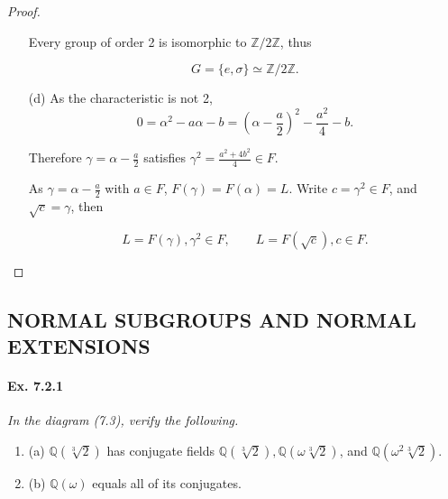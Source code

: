 \documentclass[11pt,a4paper]{article}
\newcommand{\be} {\begin{enumerate}}
\newcommand{\ee} {\end{enumerate}}
\newcommand{\Q}{\mathbb{Q}}
\newcommand{\Z}{\mathbb{Z}}
\begin{document}
\begin{proof}
\begin{enumerate}
Every group of order 2 is isomorphic to  $\Z/2\Z$, thus

$$G = \{e,\sigma\} \simeq \Z/2\Z.$$


\item[(d)]
As the characteristic is not 2,
$$0 = \alpha^2 - a\alpha - b = \left(\alpha - \frac{a}{2}\right)^2 -\frac{a^2}{4} - b.$$

Therefore $\gamma = \alpha - \frac{a}{2}$ satisfies $\gamma^2 = \frac{a^2+4b^2}{4} \in F$.

As $\gamma = \alpha - \frac{a}{2}$ with  $a\in F$,  $F(\gamma) =F(\alpha) = L$. Write $c = \gamma^2 \in F$, and $\sqrt{c} = \gamma$, then

$$L = F(\gamma), \gamma^2 \in F , \qquad  L = F(\sqrt{c}) , c \in F.$$
\end{enumerate}
\end{proof}

\subsection{NORMAL SUBGROUPS AND NORMAL EXTENSIONS}

\paragraph{Ex. 7.2.1}

{\it In the diagram (7.3), verify the following.
\be
\item[(a)] $\Q(\sqrt[3]{2})$ has conjugate fields $\Q(\sqrt[3]{2}),\Q(\omega \sqrt[3]{2})$, and $\Q(\omega^2 \sqrt[3]{2})$.
\item[(b)] $\Q(\omega)$ equals all of its conjugates.
\ee
}
\end{document}
